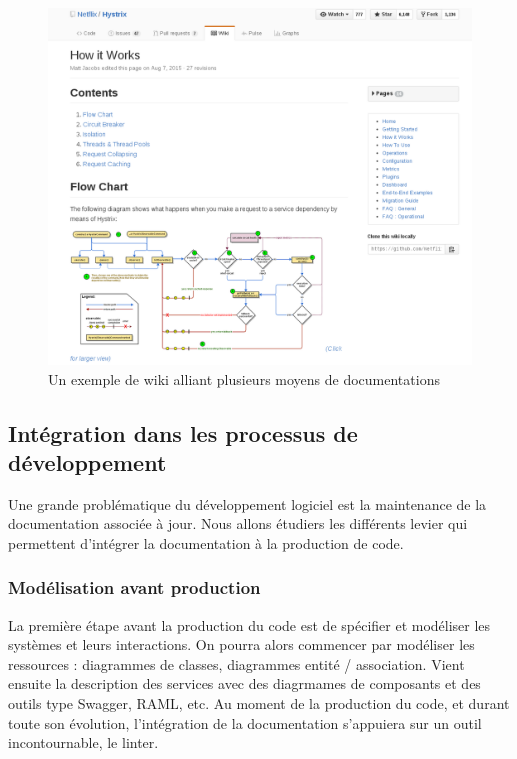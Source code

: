        \begin{figure}[ht]
            \centering
            \includegraphics[width=\textwidth]{./assets/wiki_example.png}
            \caption{Un exemple de wiki alliant plusieurs moyens de documentations}
        \end{figure}

\newpage
\subsection{Intégration dans les processus de développement}
        Une grande problématique du développement logiciel est la maintenance de la documentation associée
        à jour. Nous allons étudiers les différents levier qui permettent d'intégrer la documentation
        à la production de code.

    \subsubsection{Modélisation avant production}
        La première étape avant la production du code est de spécifier et modéliser les systèmes et leurs
        interactions. On pourra alors commencer par modéliser les ressources : diagrammes de classes,
        diagrammes entité / association. Vient ensuite la description des services avec des diagrmames de composants
        et des outils type Swagger, RAML, etc. Au moment de la production du code, et durant toute son évolution,
        l'intégration de la documentation s'appuiera sur un outil incontournable, le linter.

